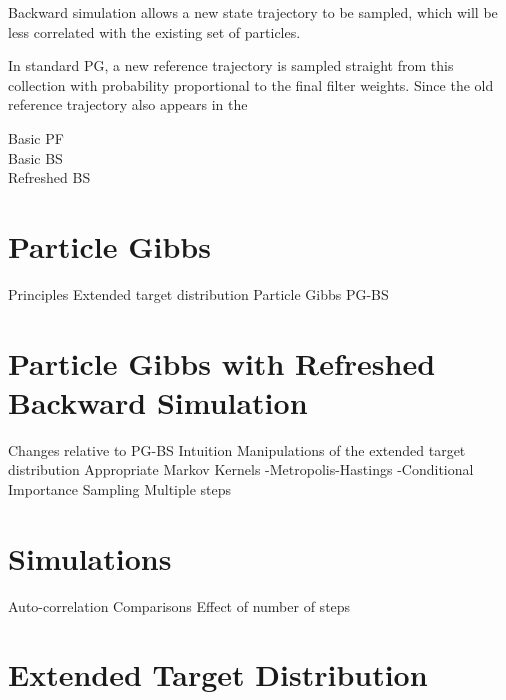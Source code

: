 \documentclass{article}
\begin{document}
Backward simulation allows a new state trajectory to be sampled, which will be less correlated with the existing set of particles. 

In standard PG, a new reference trajectory is sampled straight from this collection with probability proportional to the final filter weights. Since the old reference trajectory also appears in the 




{\meta 
Basic PF\\
Basic BS\\
Refreshed BS}

\section{Particle Gibbs}
Principles
Extended target distribution
Particle Gibbs
PG-BS

\section{Particle Gibbs with Refreshed Backward Simulation}
Changes relative to PG-BS
Intuition
Manipulations of the extended target distribution
Appropriate Markov Kernels
 -Metropolis-Hastings
 -Conditional Importance Sampling
Multiple steps

\section{Simulations}
Auto-correlation Comparisons
Effect of number of steps




\section{Extended Target Distribution}
\end{document}

